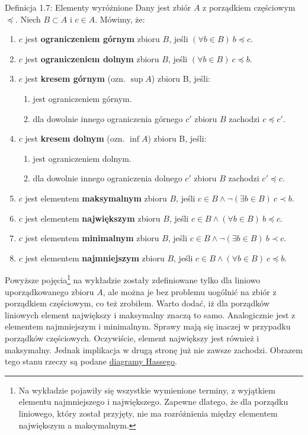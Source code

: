\documentclass{article}
\begin{document}
\begin{defr}{Definicja 1.7: Elementy wyróżnione}
    Dany jest zbiór $A$ z porządkiem częściowym $\preceq$. Niech $B\subset A$ i $c\in A$. Mówimy, że:
    \begin{enumerate}[label=\Roman*.]
        \item $c$ jest \textbf{ograniczeniem górnym} zbioru $B$, jeśli $(\forall b\in B)\ b \preceq c.$
        \item $c$ jest \textbf{ograniczeniem dolnym} zbioru $B$, jeśli $(\forall b\in B)\ c \preceq b.$
        \item $c$  jest \textbf{kresem górnym} (ozn. $\sup{A}$) zbioru B, jeśli:
            \begin{enumerate}
            \item jest ograniczeniem górnym.
            \item dla dowolnie innego ograniczenia górnego $c'$ zbioru $B$ zachodzi $c\preceq c'$.
            \end{enumerate}
        \item $c$  jest \textbf{kresem dolnym} (ozn. $\inf{A}$) zbioru B, jeśli:
            \begin{enumerate}
            \item jest ograniczeniem dolnym.
            \item dla dowolnie innego ograniczenia dolnego $c'$ zbioru $B$ zachodzi $c'\preceq c$.
            \end{enumerate}
        \item $c$ jest elementem \textbf{maksymalnym} zbioru $B$, jeśli $c\in B \land
        \lnot(\exists b\in B)\
        c\prec b$.
        \item $c$ jest elementem \textbf{największym} zbioru $B$, jeśli $c\in B \land
        (\forall b\in B)\ b 
        \preceq c$.
        \item $c$ jest elementem \textbf{minimalnym} zbioru $B$, jeśli $c\in B \land
        \lnot(\exists b\in B)\ 
        b\prec c$.
        \item $c$ jest elementem \textbf{najmniejszym} zbioru $B$, jeśli $c\in B \land
        (\forall b\in B)\ 
        c\preceq b$.
    \end{enumerate}
\end{defr}

Powyższe pojęcia\footnote{Na wykładzie pojawiły się wszystkie wymienione terminy, z
wyjątkiem elementu najmniejszego i największego. Zapewne dlatego, że dla porządku liniowego, który
został przyjęty, nie ma rozróżnienia między elementem największym a maksymalnym.}
na wykładzie zostały zdefiniowane tylko dla liniowo uporządkowanego zbioru $A$,
ale można je bez problemu uogólnić na zbiór z porządkiem częściowym, co też zrobiłem. Warto dodać, iż dla porządków
liniowych element największy i maksymalny znaczą to samo. Analogicznie jest z elementem najmniejszym
i minimalnym. Sprawy mają się inaczej w przypadku porządków częściowych. Oczywiście, element
największy jest również i maksymalny. Jednak implikacja w drugą stronę już nie zawsze zachodzi.
Obrazem tego stanu rzeczy są podane \href{https://calcworkshop.com/wp-content/uploads/hasse-diagram-find-the-maximal-minimal-least-and-greatest.png}{{\color{blue} \underline{diagramy Hassego}}}.
\end{document}
